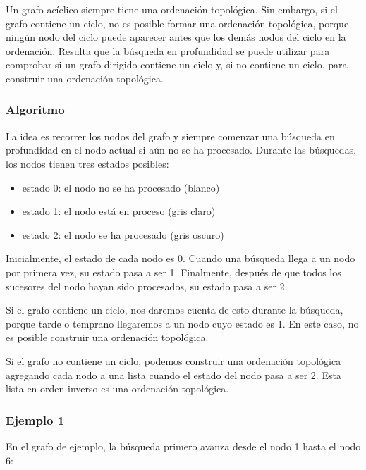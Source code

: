 Un grafo acíclico siempre tiene una ordenación topológica.
Sin embargo, si el grafo contiene un ciclo,
no es posible formar una ordenación topológica,
porque ningún nodo del ciclo puede aparecer
antes que los demás nodos del ciclo en la ordenación.
Resulta que la búsqueda en profundidad se puede utilizar
para comprobar si un grafo dirigido contiene un ciclo
y, si no contiene un ciclo, para construir una ordenación topológica.

\subsubsection{Algoritmo}

La idea es recorrer los nodos del grafo
y siempre comenzar una búsqueda en profundidad en el nodo actual
si aún no se ha procesado.
Durante las búsquedas, los nodos tienen tres estados posibles:

\begin{itemize}
\item estado 0: el nodo no se ha procesado (blanco)
\item estado 1: el nodo está en proceso (gris claro)
\item estado 2: el nodo se ha procesado (gris oscuro)
\end{itemize}

Inicialmente, el estado de cada nodo es 0.
Cuando una búsqueda llega a un nodo por primera vez,
su estado pasa a ser 1.
Finalmente, después de que todos los sucesores del nodo hayan
sido procesados, su estado pasa a ser 2.

Si el grafo contiene un ciclo, nos daremos cuenta de esto
durante la búsqueda, porque tarde o temprano
llegaremos a un nodo cuyo estado es 1.
En este caso, no es posible construir una ordenación topológica.

Si el grafo no contiene un ciclo, podemos construir
una ordenación topológica agregando cada nodo a una lista cuando el estado del nodo pasa a ser 2.
Esta lista en orden inverso es una ordenación topológica.

\subsubsection{Ejemplo 1}

En el grafo de ejemplo, la búsqueda primero avanza
desde el nodo 1 hasta el nodo 6:

